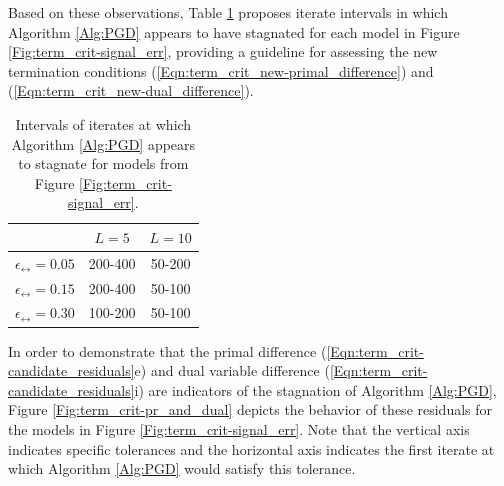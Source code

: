 Based on these observations, Table \ref{Tab:term_crit-desired_termination_windows} proposes iterate intervals in which Algorithm \ref{Alg:PGD} appears to have stagnated for each model in Figure \ref{Fig:term_crit-signal_err}, providing a guideline for assessing the new termination conditions (\ref{Eqn:term_crit_new-primal_difference}) and (\ref{Eqn:term_crit_new-dual_difference}).
\begin{table}[H]
\centering
\begin{tabular}{ |c|c|c| }
\hline
&	$L = 5$
	&	$L = 10$	\\
 \hline
$\epsilon_\rel = 0.05$
&     200-400 &   50-200 		\\
 \hline
$\epsilon_\rel = 0.15$
&  200-400 &  50-100 	\\
 \hline
$\epsilon_\rel = 0.30$
&  100-200 &  50-100	\\
 \hline
\end{tabular}
	\caption{Intervals of iterates at which Algorithm \ref{Alg:PGD} appears to stagnate for models from Figure \ref{Fig:term_crit-signal_err}.}
	\label{Tab:term_crit-desired_termination_windows}
\end{table}







In order to demonstrate that the primal difference (\ref{Eqn:term_crit-candidate_residuals}e) and dual variable difference (\ref{Eqn:term_crit-candidate_residuals}i) are indicators of the stagnation of Algorithm \ref{Alg:PGD}, Figure \ref{Fig:term_crit-pr_and_dual} depicts the behavior of these residuals for the models in Figure \ref{Fig:term_crit-signal_err}.  
Note that the vertical axis indicates specific tolerances and the horizontal axis indicates the first iterate at which Algorithm \ref{Alg:PGD} would satisfy this tolerance.


